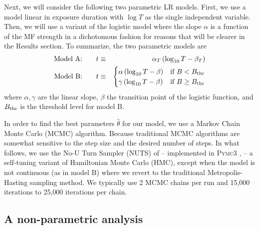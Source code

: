 \documentclass[a4]{article}
\begin{document}
Next, we will consider the following two parametric LR models. First, we use a  model linear in exposure duration with $\log T$ as the single independent variable. Then,  we will use a variant of the logistic model where the slope $\alpha$ is a function of the MF strength in a dichotomous fashion for reasons that will be clearer in the Results section. 
To summarize, the two   parametric models are
\begin{eqnarray}
\hbox{Model A:}\qquad 
t&\equiv&\alpha_T\,(\log_{10} T-\beta_T)   \label{eq:model1}\\
\hbox{Model B:}\qquad 
t&\equiv& \begin{cases}
 \alpha\, ( \log_{10} T - \beta ) & \text{if $ B < B_{\rm thr}$}\\
 \gamma\,( \log_{10} T-\beta ) & \text{if $B\geq B_{\rm thr}$} 
\end{cases}\label{eq:model3}
\end{eqnarray}
where $\alpha,\gamma$ are the linear slope, $\beta$ the transition point of the logistic function, and $B_{\rm thr}$ is the threshold level for model B. 

In order to find the best parameters $\hat \theta$ for our model, we  use a Markov Chain Monte Carlo  
(MCMC) algorithm. Because traditional MCMC algorithms are somewhat sensitive to the step size  and the desired number of steps. In what follows, we use the No-U Turn Sampler (NUTS) of \citet{Hoffman2014} -- implemented in \textsc{Pymc3} \citet{pymc3}, -- a self-tuning variant of Hamiltonian Monte Carlo (HMC), except when the model is not continuous  (as in model B) where we revert to  the traditional Metropolis-Hasting sampling method.
We typically use 2   MCMC chains per run and 15,000 iterations to 25,000 iterations per chain.
 
\subsection*{A non-parametric analysis}
\end{document}
